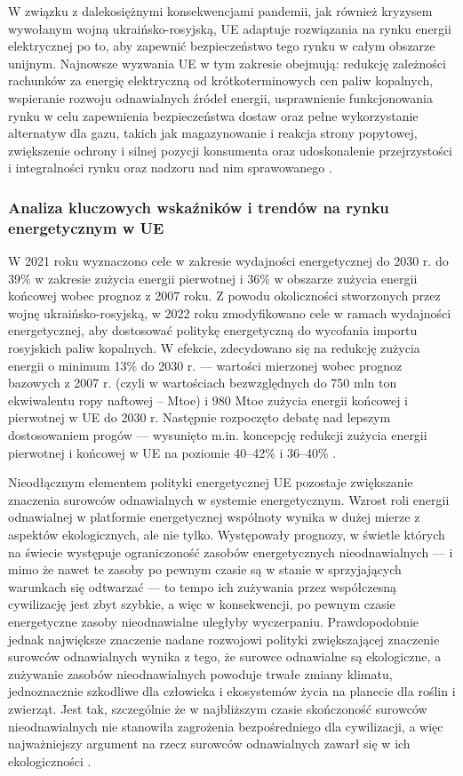 \documentclass[polish, twoside, 12pt, a4paper]{article}
\theoremstyle{definition}
\theoremstyle{plain}
\theoremstyle{remark}
\begin{document}
W związku z dalekosiężnymi konsekwencjami pandemii, jak również kryzysem wywołanym wojną ukraińsko-rosyjską, UE adaptuje rozwiązania na rynku energii elektrycznej po to, aby zapewnić bezpieczeństwo tego rynku w całym obszarze unijnym. Najnowsze wyzwania UE w tym zakresie obejmują: redukcję zależności rachunków za energię elektryczną od krótkoterminowych cen paliw kopalnych, wspieranie rozwoju odnawialnych źródeł energii, usprawnienie funkcjonowania rynku w celu zapewnienia bezpieczeństwa dostaw oraz pełne wykorzystanie alternatyw dla gazu, takich jak magazynowanie i reakcja strony popytowej, zwiększenie ochrony i silnej pozycji konsumenta oraz udoskonalenie przejrzystości i integralności rynku oraz nadzoru nad nim sprawowanego \parencite{ec2023}. 


\subsubsection{Analiza kluczowych wskaźników i trendów na rynku energetycznym w UE}

W 2021 roku wyznaczono cele w zakresie wydajności energetycznej do 2030 r. do 39\% w zakresie zużycia energii pierwotnej i 36\% w obszarze zużycia energii końcowej wobec prognoz z 2007 roku. Z powodu okoliczności stworzonych przez wojnę ukraińsko-rosyjską, w 2022 roku zmodyfikowano cele w ramach wydajności energetycznej, aby dostosować politykę energetyczną do wycofania importu rosyjskich paliw kopalnych. W efekcie, zdecydowano się na redukcję zużycia energii o minimum 13\% do 2030 r. --- wartości mierzonej wobec prognoz bazowych z 2007 r. (czyli w wartościach bezwzględnych do 750 mln ton ekwiwalentu ropy naftowej – Mtoe) i 980 Mtoe zużycia energii końcowej i pierwotnej w UE do 2030 r. Następnie rozpoczęto debatę nad lepszym dostosowaniem progów --- wysunięto m.in. koncepcję redukcji zużycia energii pierwotnej i końcowej w UE na poziomie 40–42\% i 36–40\% \parencite{ep2023}.

Nieodłącznym elementem polityki energetycznej UE pozostaje zwiększanie znaczenia surowców odnawialnych w systemie energetycznym. Wzrost roli energii odnawialnej w platformie energetycznej wspólnoty wynika w dużej mierze z aspektów ekologicznych, ale nie tylko. Występowały prognozy, w świetle których na świecie występuje ograniczoność zasobów energetycznych nieodnawialnych --- i mimo że nawet te zasoby po pewnym czasie są w stanie w sprzyjających warunkach się odtwarzać --- to tempo ich zużywania przez współczesną cywilizację jest zbyt szybkie, a więc w konsekwencji, po pewnym czasie energetyczne zasoby nieodnawialne uległyby wyczerpaniu. Prawdopodobnie jednak największe znaczenie nadane rozwojowi polityki zwiększającej znaczenie surowców odnawialnych wynika z tego, że surowce odnawialne są ekologiczne, a zużywanie zasobów nieodnawialnych powoduje trwałe zmiany klimatu, jednoznacznie szkodliwe dla człowieka i ekosystemów życia na planecie dla roślin i zwierząt. Jest tak, szczególnie że w najbliższym czasie skończoność surowców nieodnawialnych nie stanowiła zagrożenia bezpośredniego dla cywilizacji, a więc najważniejszy argument na rzecz surowców odnawialnych zawarł się w ich ekologiczności \parencite{ep2023}. 
\end{document}
